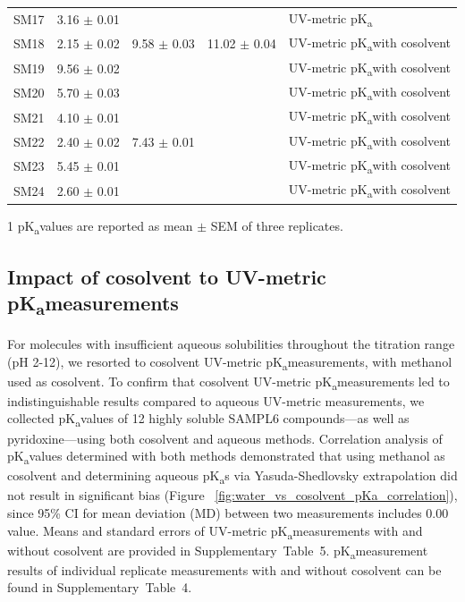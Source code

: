 \documentclass[9pt,lineno]{elife}
\newcommand{\pKa}{pK\textsubscript{a}}
\begin{document}
\begin{table}[tb!]
\begin{center}
\begin{threeparttable}
\begin{tabular}{@{}lllll@{}}
SM17 & 3.16 $\pm$ 0.01 &  &  & UV-metric \pKa \\
SM18 & 2.15 $\pm$ 0.02 & 9.58 $\pm$ 0.03 & 11.02 $\pm$ 0.04 & UV-metric \pKa with cosolvent \\
SM19 & 9.56 $\pm$ 0.02 &  &  & UV-metric \pKa with cosolvent \\
SM20 & 5.70 $\pm$ 0.03 &  &  & UV-metric \pKa with cosolvent \\
SM21 & 4.10 $\pm$ 0.01 &  &  & UV-metric \pKa with cosolvent \\
SM22 & 2.40 $\pm$ 0.02 & 7.43 $\pm$ 0.01 &  & UV-metric \pKa with cosolvent \\
SM23 & 5.45 $\pm$ 0.01 &  &  & UV-metric \pKa with cosolvent \\
SM24 & 2.60 $\pm$ 0.01 &  &  & UV-metric \pKa with cosolvent \\ \bottomrule
\end{tabular}
\begin{tablenotes}
\item[1] \pKa values are reported as mean $\pm$ SEM of three replicates.
\end{tablenotes}
\end{threeparttable}
\end{center}
\end{table}

\subsection{Impact of cosolvent to UV-metric \pKa measurements}
For molecules with insufficient aqueous solubilities throughout the titration range (pH 2-12), we resorted to cosolvent UV-metric \pKa measurements, with methanol used as cosolvent. 
To confirm that cosolvent UV-metric \pKa measurements led to indistinguishable results compared to aqueous UV-metric measurements, we collected \pKa values of 12 highly soluble SAMPL6 compounds---as well as pyridoxine---using both cosolvent and aqueous methods. 
Correlation analysis of \pKa values determined with both methods demonstrated that using methanol as cosolvent and determining aqueous \pKa s via Yasuda-Shedlovsky extrapolation did not result in significant bias (Figure ~\ref{fig:water_vs_cosolvent_pKa_correlation}), since 95\% CI for mean deviation (MD) between two measurements includes 0.00 value.  
Means and standard errors of UV-metric \pKa measurements with and without cosolvent are provided in Supplementary~Table~5. 
\pKa measurement results of individual replicate measurements with and without cosolvent can be found in Supplementary~Table~4.
\end{document}
